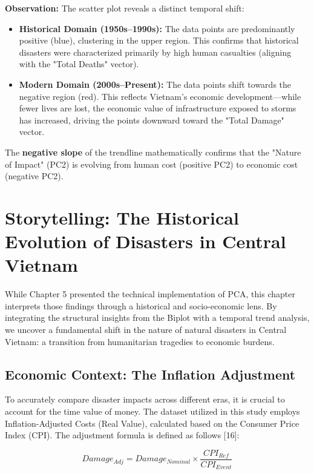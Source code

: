 \documentclass[12pt, a4paper]{report}
\begin{document}
\textbf{Observation:}
The scatter plot reveals a distinct temporal shift:
\begin{itemize}
    \item \textbf{Historical Domain (1950s–1990s):} The data points are predominantly positive (blue), clustering in the upper region. This confirms that historical disasters were characterized primarily by high human casualties (aligning with the "Total Deaths" vector).
    \item \textbf{Modern Domain (2000s–Present):} The data points shift towards the negative region (red). This reflects Vietnam's economic development—while fewer lives are lost, the economic value of infrastructure exposed to storms has increased, driving the points downward toward the "Total Damage" vector.
\end{itemize}
The \textbf{negative slope} of the trendline mathematically confirms that the "Nature of Impact" (PC2) is evolving from human cost (positive PC2) to economic cost (negative PC2).
\chapter{Storytelling: The Historical Evolution of Disasters in Central Vietnam}

While Chapter 5 presented the technical implementation of PCA, this chapter interprets those findings through a historical and socio-economic lens. By integrating the structural insights from the Biplot with a temporal trend analysis, we uncover a fundamental shift in the nature of natural disasters in Central Vietnam: a transition from humanitarian tragedies to economic burdens.

\section{Economic Context: The Inflation Adjustment}
To accurately compare disaster impacts across different eras, it is crucial to account for the time value of money. The dataset utilized in this study employs Inflation-Adjusted Costs (Real Value), calculated based on the Consumer Price Index (CPI). The adjustment formula is defined as follows [16]:

\begin{equation}
    Damage_{Adj} = Damage_{Nominal} \times \frac{CPI_{Ref}}{CPI_{Event}}
\end{equation}
\end{document}
